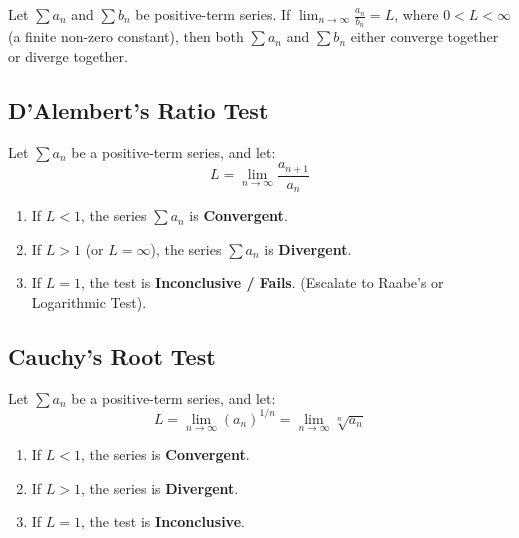 \begin{theorem}
Let $\sum a_n$ and $\sum b_n$ be positive-term series. If $\lim_{n\to\infty} \frac{a_n}{b_n} = L$, where $0 < L < \infty$ (a finite non-zero constant), then both $\sum a_n$ and $\sum b_n$ either converge together or diverge together.
\end{theorem}

\subsection{D'Alembert's Ratio Test}

\begin{theorem}
Let $\sum a_n$ be a positive-term series, and let:
\begin{equation}
    L = \lim_{n\to\infty} \frac{a_{n+1}}{a_n}
\end{equation}
\begin{enumerate}[leftmargin=1.5em]
    \item If $L < 1$, the series $\sum a_n$ is \textbf{Convergent}.
    \item If $L > 1$ (or $L = \infty$), the series $\sum a_n$ is \textbf{Divergent}.
    \item If $L = 1$, the test is \textbf{Inconclusive / Fails}. (Escalate to Raabe's or Logarithmic Test).
\end{enumerate}
\end{theorem}

\subsection{Cauchy's Root Test}

\begin{theorem}
Let $\sum a_n$ be a positive-term series, and let:
\begin{equation}
    L = \lim_{n\to\infty} (a_n)^{1/n} = \lim_{n\to\infty} \sqrt[n]{a_n}
\end{equation}
\begin{enumerate}[leftmargin=1.5em]
    \item If $L < 1$, the series is \textbf{Convergent}.
    \item If $L > 1$, the series is \textbf{Divergent}.
    \item If $L = 1$, the test is \textbf{Inconclusive}.
\end{enumerate}
\end{theorem}

